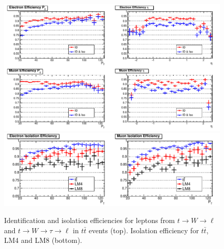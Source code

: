 \begin{figure}[tbh]
\begin{center}
\includegraphics[width=1.0\linewidth]{plots/ttbar_eff.pdf}
\includegraphics[width=1.0\linewidth]{plots/ttbar_LM4_LM8_isoeff.pdf}
\caption{\label{fig:effttbar}\protect 
Identification and isolation efficiencies for leptons from $t \to W \to \ell$ and 
$t \to W \to \tau \to \ell$ in $t\bar{t}$ events (top). Isolation efficiency
for $t\bar{t}$, LM4 and LM8 (bottom).}
\end{center}
\end{figure}


